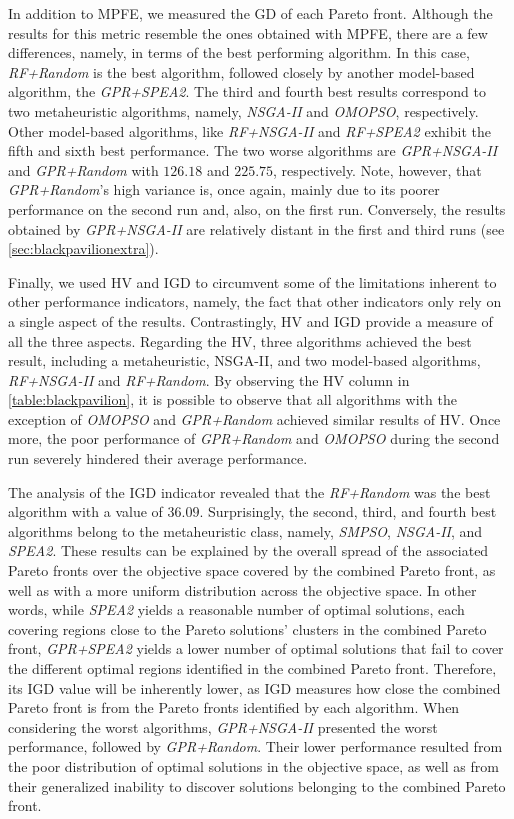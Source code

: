 In addition to \ac{MPFE}, we measured the \ac{GD} of each Pareto front. Although the results for this metric resemble the ones obtained with \ac{MPFE}, there are a few differences, namely, in terms of the best performing algorithm. In this case, \textit{RF+Random} is the best algorithm, followed closely by another model-based algorithm, the \textit{GPR+SPEA2}. The third and fourth best results correspond to two metaheuristic algorithms, namely, \textit{\ac{NSGA-II}} and \textit{OMOPSO}, respectively. Other model-based algorithms, like \textit{RF+NSGA-II} and \textit{RF+SPEA2} exhibit the fifth and sixth best performance. The two worse algorithms are \textit{GPR+NSGA-II} and \textit{GPR+Random} with $126.18$ and $225.75$, respectively. Note, however, that \textit{GPR+Random}'s high variance is, once again, mainly due to its poorer performance on the second run and, also, on the first run. Conversely, the results obtained by \textit{GPR+NSGA-II} are relatively distant in the first and third runs (see \cref{sec:blackpavilionextra}).

Finally, we used \ac{HV} and \ac{IGD} to circumvent some of the limitations inherent to other performance indicators, namely, the fact that other indicators only rely on a single aspect of the results. Contrastingly, \ac{HV} and \ac{IGD} provide a measure of all the three aspects. Regarding the \ac{HV}, three algorithms achieved the best result, including a metaheuristic, \ac{NSGA-II}, and two model-based algorithms, \textit{RF+NSGA-II} and \textit{RF+Random}. By observing the \ac{HV} column in \cref{table:blackpavilion}, it is possible to observe that all algorithms with the exception of \textit{OMOPSO} and \textit{GPR+Random} achieved similar results of \ac{HV}. Once more, the poor performance of \textit{GPR+Random} and \textit{OMOPSO} during the second run severely hindered their average performance.

The analysis of the \ac{IGD} indicator revealed that the \textit{RF+Random} was the best algorithm with a value of $36.09$. Surprisingly, the second, third, and fourth best algorithms belong to the metaheuristic class, namely, \textit{SMPSO}, \textit{\ac{NSGA-II}}, and \textit{\ac{SPEA2}}. These results can be explained by the overall spread of the associated Pareto fronts over the objective space covered by the combined Pareto front, as well as with a more uniform distribution across the objective space. In other words, while \textit{\ac{SPEA2}} yields a reasonable number of optimal solutions, each covering regions close to the Pareto solutions' clusters in the combined Pareto front, \textit{GPR+SPEA2} yields a lower number of optimal solutions that fail to cover the different optimal regions identified in the combined Pareto front. Therefore, its \ac{IGD} value will be inherently lower, as \ac{IGD} measures how close the combined Pareto front is from the Pareto fronts identified by each algorithm. When considering the worst algorithms, \textit{GPR+NSGA-II} presented the worst performance, followed by \textit{GPR+Random}. Their lower performance resulted from the poor distribution of optimal solutions in the objective space, as well as from their generalized inability to discover solutions belonging to the combined Pareto front. 

